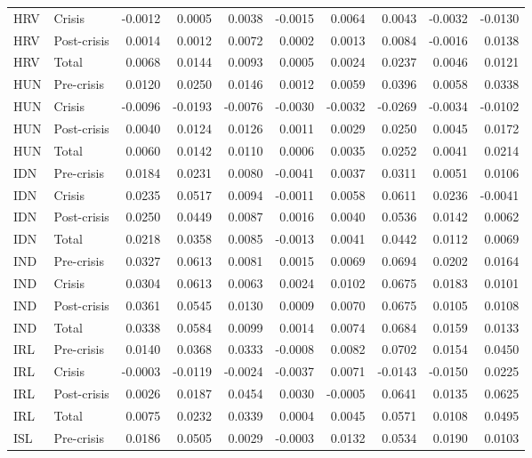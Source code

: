 \begin{longtable}[t]{llrrrrrrrr}
HRV & Crisis & -0.0012 & 0.0005 & 0.0038 & -0.0015 & 0.0064 & 0.0043 & -0.0032 & -0.0130\\
HRV & Post-crisis & 0.0014 & 0.0012 & 0.0072 & 0.0002 & 0.0013 & 0.0084 & -0.0016 & 0.0138\\
HRV & Total & 0.0068 & 0.0144 & 0.0093 & 0.0005 & 0.0024 & 0.0237 & 0.0046 & 0.0121\\
\addlinespace
HUN & Pre-crisis & 0.0120 & 0.0250 & 0.0146 & 0.0012 & 0.0059 & 0.0396 & 0.0058 & 0.0338\\
HUN & Crisis & -0.0096 & -0.0193 & -0.0076 & -0.0030 & -0.0032 & -0.0269 & -0.0034 & -0.0102\\
HUN & Post-crisis & 0.0040 & 0.0124 & 0.0126 & 0.0011 & 0.0029 & 0.0250 & 0.0045 & 0.0172\\
HUN & Total & 0.0060 & 0.0142 & 0.0110 & 0.0006 & 0.0035 & 0.0252 & 0.0041 & 0.0214\\
IDN & Pre-crisis & 0.0184 & 0.0231 & 0.0080 & -0.0041 & 0.0037 & 0.0311 & 0.0051 & 0.0106\\
\addlinespace
IDN & Crisis & 0.0235 & 0.0517 & 0.0094 & -0.0011 & 0.0058 & 0.0611 & 0.0236 & -0.0041\\
IDN & Post-crisis & 0.0250 & 0.0449 & 0.0087 & 0.0016 & 0.0040 & 0.0536 & 0.0142 & 0.0062\\
IDN & Total & 0.0218 & 0.0358 & 0.0085 & -0.0013 & 0.0041 & 0.0442 & 0.0112 & 0.0069\\
IND & Pre-crisis & 0.0327 & 0.0613 & 0.0081 & 0.0015 & 0.0069 & 0.0694 & 0.0202 & 0.0164\\
IND & Crisis & 0.0304 & 0.0613 & 0.0063 & 0.0024 & 0.0102 & 0.0675 & 0.0183 & 0.0101\\
\addlinespace
IND & Post-crisis & 0.0361 & 0.0545 & 0.0130 & 0.0009 & 0.0070 & 0.0675 & 0.0105 & 0.0108\\
IND & Total & 0.0338 & 0.0584 & 0.0099 & 0.0014 & 0.0074 & 0.0684 & 0.0159 & 0.0133\\
IRL & Pre-crisis & 0.0140 & 0.0368 & 0.0333 & -0.0008 & 0.0082 & 0.0702 & 0.0154 & 0.0450\\
IRL & Crisis & -0.0003 & -0.0119 & -0.0024 & -0.0037 & 0.0071 & -0.0143 & -0.0150 & 0.0225\\
IRL & Post-crisis & 0.0026 & 0.0187 & 0.0454 & 0.0030 & -0.0005 & 0.0641 & 0.0135 & 0.0625\\
\addlinespace
IRL & Total & 0.0075 & 0.0232 & 0.0339 & 0.0004 & 0.0045 & 0.0571 & 0.0108 & 0.0495\\
ISL & Pre-crisis & 0.0186 & 0.0505 & 0.0029 & -0.0003 & 0.0132 & 0.0534 & 0.0190 & 0.0103\\

\end{longtable}
